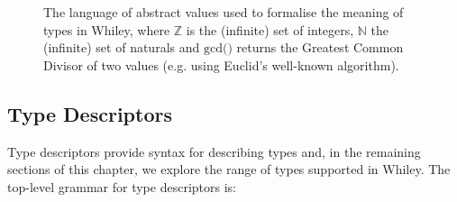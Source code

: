 \begin{figure}[!t]
\caption{The language of abstract values used to formalise the meaning of types in Whiley, where $\mathbb{Z}$ is the (infinite) set of integers, $\mathbb{N}$ the (infinite) set of naturals and $\textrm{gcd()}$ returns the Greatest Common Divisor of two values (e.g. using Euclid's well-known algorithm).}
\label{c_types_abstract_values}
\end{figure}

\subsection{Type Descriptors}
\label{c_types_type_descriptors}
Type descriptors provide syntax for describing types and, in the remaining sections of this chapter, we explore the range of types supported in Whiley.  The top-level grammar for type descriptors is:

